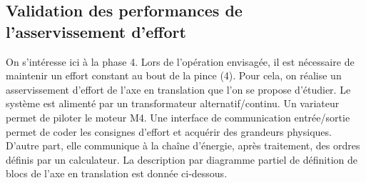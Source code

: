 \documentclass[10pt,fleqn]{article} %
\begin{document}

\subsection{Validation des performances de l’asservissement d’effort}
On s’intéresse ici à la phase 4. Lors de l’opération envisagée, il est nécessaire de maintenir un effort
constant au bout de la pince (4). Pour cela, on réalise un asservissement d’effort de l’axe en translation que
l’on se propose d’étudier.
Le système est alimenté par un transformateur alternatif/continu. Un variateur permet de piloter le moteur
M4. Une interface de communication entrée/sortie permet de coder les consignes d’effort et acquérir des
grandeurs physiques. D’autre part, elle communique à la chaîne d’énergie, après traitement, des ordres
définis par un calculateur.
La description par diagramme partiel de définition de blocs de l’axe en translation est donnée ci-dessous. %
\end{document}
